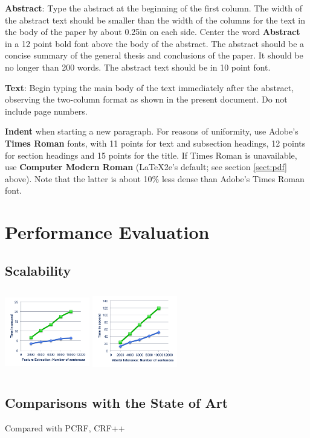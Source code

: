 \documentclass[11pt,letterpaper]{article}
\begin{document}
{\bf Abstract}: Type the abstract at the beginning of the first
column.  The width of the abstract text should be smaller than the
width of the columns for the text in the body of the paper by about
0.25in on each side.  Center the word {\bf Abstract} in a 12 point
bold font above the body of the abstract. The abstract should be a
concise summary of the general thesis and conclusions of the paper.
It should be no longer than 200 words.  The abstract text should be in 10 point font.

{\bf Text}: Begin typing the main body of the text immediately after
the abstract, observing the two-column format as shown in 
the present document.  Do not include page numbers.

{\bf Indent} when starting a new paragraph. For reasons of uniformity,
use Adobe's {\bf Times Roman} fonts, with 11 points for text and 
subsection headings, 12 points for section headings and 15 points for
the title.  If Times Roman is unavailable, use {\bf Computer Modern
  Roman} (\LaTeX2e{}'s default; see section \ref{sect:pdf} above).
Note that the latter is about 10\% less dense than Adobe's Times Roman
font.

\section{Performance Evaluation}
\label{sec:length}

\subsection{Scalability}
\includegraphics[height=9.9em,width=10em]{extraction.png}
\includegraphics[height=9.9em,width=10em]{viterbi.png}

\subsection{Comparisons with the State of Art}
Compared with PCRF, CRF++
\end{document}
